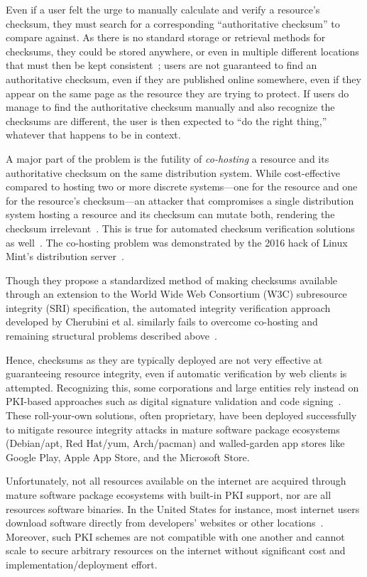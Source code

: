 Even if a user felt the urge to manually calculate and verify a resource's
checksum, they must search for a corresponding ``authoritative checksum'' to
compare against. As there is no standard storage or retrieval methods for
checksums, they could be stored anywhere, or even in multiple different
locations that must then be kept consistent~\cite{Cherubini}; users are not
guaranteed to find an authoritative checksum, even if they are published online
somewhere, even if they appear on the same page as the resource they are trying
to protect. If users do manage to find the authoritative checksum manually and
also recognize the checksums are different, the user is then expected to ``do
the right thing,'' whatever that happens to be in context.

A major part of the problem is the futility of \emph{co-hosting} a resource and
its authoritative checksum on the same distribution system. While cost-effective
compared to hosting two or more discrete systems---one for the resource and one
for the resource's checksum---an attacker that compromises a single distribution
system hosting a resource and its checksum can mutate both, rendering the
checksum irrelevant~\cite{Stickler}. This is true for automated checksum
verification solutions as well~\cite{Cherubini}. The co-hosting problem was
demonstrated by the 2016 hack of Linux Mint's distribution
server~\cite{SCA-MINT1, SCA-MINT2}.

Though they propose a standardized method of making checksums available through
an extension to the World Wide Web Consortium (W3C) subresource integrity (SRI)
specification, the automated integrity verification approach developed by
Cherubini et al. similarly fails to overcome co-hosting and remaining structural
problems described above~\cite{Cherubini}.

Hence, checksums as they are typically deployed are not very effective at
guaranteeing resource integrity, even if automatic verification by web clients
is attempted. Recognizing this, some corporations and large entities rely
instead on PKI-based approaches such as digital signature validation and code
signing~\cite{PKI}. These roll-your-own solutions, often proprietary, have been
deployed successfully to mitigate resource integrity attacks in mature software
package ecosystems (\eg Debian/apt, Red Hat/yum, Arch/pacman) and walled-garden
app stores like Google Play, Apple App Store, and the Microsoft Store.

Unfortunately, not all resources available on the internet are acquired through
mature software package ecosystems with built-in PKI support, nor are all
resources software binaries. In the United States for instance, most internet
users download software directly from developers' websites or other
locations~\cite{Cherubini, File}. Moreover, such PKI schemes are not compatible
with one another and cannot scale to secure arbitrary resources on the internet
without significant cost and implementation/deployment effort.

